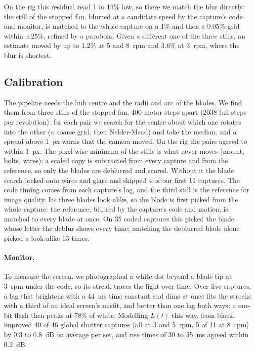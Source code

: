 On the rig this residual read 1 to 13\% low, so there we match the blur directly: the still of the
stopped fan, blurred at a candidate speed by the capture's code and monitor, is matched to the whole
capture on a 1\% and then a 0.05\% grid within $\pm25\%$, refined by a parabola. Given a different
one of the three stills, an estimate moved by up to 1.2\% at 5 and \SI{8}{rpm} and 3.6\% at
\SI{3}{rpm}, where the blur is shortest.

\subsection{Calibration}
\label{sec:calibration}
The pipeline needs the hub centre and the radii and arc of the blades. We find them from three
stills of the stopped fan, 400 motor steps apart (\SI{2038}{} full steps per revolution): for each
pair we search for the centre about which one rotates into the other (a coarse grid, then
Nelder-Mead) and take the median, and a spread above \SI{1}{px} warns that the camera moved. On the
rig the pairs agreed to within \SI{1}{px}. The pixel-wise minimum of the stills is what never moves
(mount, bolts, wires); a scaled copy is subtracted from every capture and from the reference, so only
the blades are deblurred and scored. Without it the blade search locked onto wires and glare and
skipped 4 of our first 11 captures. The code timing comes from each capture's log, and the third
still is the reference for image quality. Its three blades look alike, so the blade is first picked
from the whole capture: the reference, blurred by the capture's code and motion, is matched to every
blade at once. On 35 coded captures this picked the blade whose letter the deblur shows every time;
matching the deblurred blade alone picked a look-alike 13 times.

\paragraph{Monitor.} To measure the screen, we photographed a white dot beyond a blade tip at
\SI{3}{rpm} under the code, so its streak traces the light over time. Over five captures, a lag that
brightens with a \SI{44}{ms} time constant and dims at once fits the streaks with a third of an ideal
screen's misfit, and better than one lag both ways; a one-bit flash then peaks at 78\% of white.
Modelling $L(t)$ this way, from black, improved 40 of 46 global shutter captures (all at 3 and
\SI{5}{rpm}, 5 of 11 at \SI{8}{rpm}) by 0.3 to \SI{0.8}{dB} on average per set, and rise times of 30
to \SI{55}{ms} agreed within \SI{0.2}{dB}.

